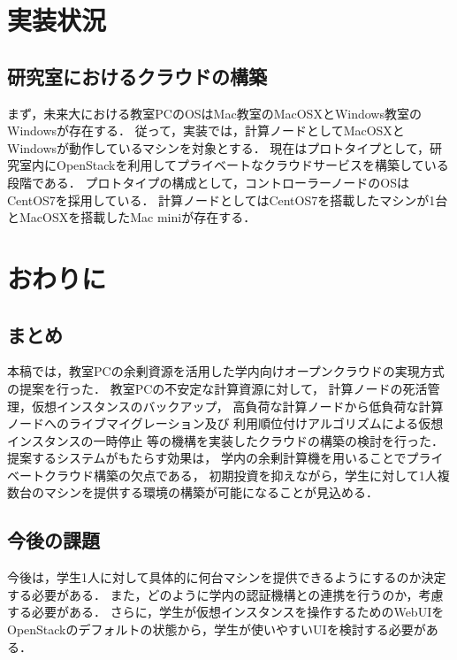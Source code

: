 \documentclass[11pt,a4paper]{jsarticle}
\begin{document}
\section{実装状況}
\subsection{研究室におけるクラウドの構築}
まず，未来大における教室PCのOSはMac教室のMacOSXとWindows教室のWindowsが存在する．
従って，実装では，計算ノードとしてMacOSXとWindowsが動作しているマシンを対象とする．
現在はプロトタイプとして，研究室内にOpenStackを利用してプライベートなクラウドサービスを構築している段階である．
プロトタイプの構成として，コントローラーノードのOSはCentOS7を採用している．
計算ノードとしてはCentOS7を搭載したマシンが1台とMacOSXを搭載したMac miniが存在する．

\section{おわりに}
\subsection{まとめ}
本稿では，教室PCの余剰資源を活用した学内向けオープンクラウドの実現方式の提案を行った．
教室PCの不安定な計算資源に対して，
計算ノードの死活管理，仮想インスタンスのバックアップ，
高負荷な計算ノードから低負荷な計算ノードへのライブマイグレーション及び
利用順位付けアルゴリズムによる仮想インスタンスの一時停止
等の機構を実装したクラウドの構築の検討を行った．
提案するシステムがもたらす効果は，
学内の余剰計算機を用いることでプライベートクラウド構築の欠点である，
初期投資を抑えながら，学生に対して1人複数台のマシンを提供する環境の構築が可能になることが見込める．
\subsection{今後の課題}
今後は，学生1人に対して具体的に何台マシンを提供できるようにするのか決定する必要がある．
また，どのように学内の認証機構との連携を行うのか，考慮する必要がある．
さらに，学生が仮想インスタンスを操作するためのWebUIをOpenStackのデフォルトの状態から，学生が使いやすいUIを検討する必要がある．


\end{document}
